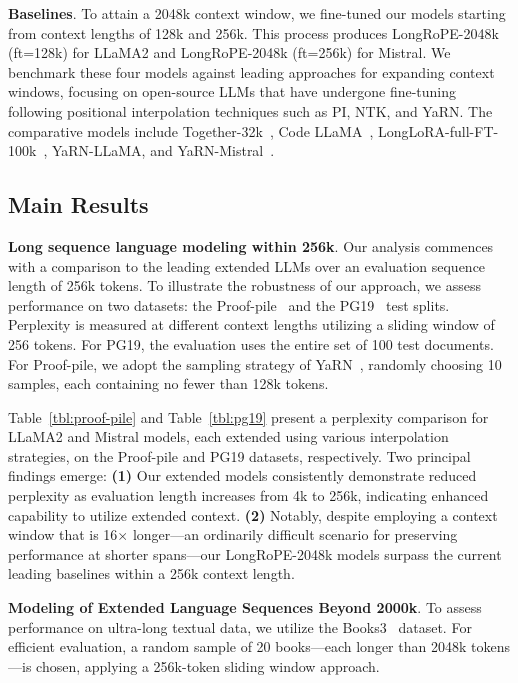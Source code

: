 \textbf{Baselines}. To attain a 2048k context window, we fine-tuned our models starting from context lengths of 128k and 256k. This process produces LongRoPE-2048k (ft=128k) for LLaMA2 and LongRoPE-2048k (ft=256k) for Mistral. We benchmark these four models against leading approaches for expanding context windows, focusing on open-source LLMs that have undergone fine-tuning following positional interpolation techniques such as PI, NTK, and YaRN. The comparative models include Together-32k~\cite{together}, Code LLaMA~\cite{codellama}, LongLoRA-full-FT-100k~\cite{longlora}, YaRN-LLaMA, and YaRN-Mistral~\cite{yarn}.

\subsection{Main Results}

\label{sec:mainresult}
\textbf{Long sequence language modeling within 256k}. Our analysis commences with a comparison to the leading extended LLMs over an evaluation sequence length of 256k tokens. To illustrate the robustness of our approach, we assess performance on two datasets: the Proof-pile~\cite{pg19} and the PG19~\cite{pile} test splits. Perplexity is measured at different context lengths utilizing a sliding window of 256 tokens. For PG19, the evaluation uses the entire set of 100 test documents. For Proof-pile, we adopt the sampling strategy of YaRN~\cite{yarn}, randomly choosing 10 samples, each containing no fewer than 128k tokens.

Table~\ref{tbl:proof-pile} and Table~\ref{tbl:pg19} present a perplexity comparison for LLaMA2 and Mistral models, each extended using various interpolation strategies, on the Proof-pile and PG19 datasets, respectively. Two principal findings emerge: \textbf{(1)} Our extended models consistently demonstrate reduced perplexity as evaluation length increases from 4k to 256k, indicating enhanced capability to utilize extended context. \textbf{(2)} Notably, despite employing a context window that is 16$\times$ longer—an ordinarily difficult scenario for preserving performance at shorter spans—our LongRoPE-2048k models surpass the current leading baselines within a 256k context length.

\textbf{Modeling of Extended Language Sequences Beyond 2000k}. To assess performance on ultra-long textual data, we utilize the Books3~\cite{pile} dataset. For efficient evaluation, a random sample of 20 books—each longer than 2048k tokens—is chosen, applying a 256k-token sliding window approach.

